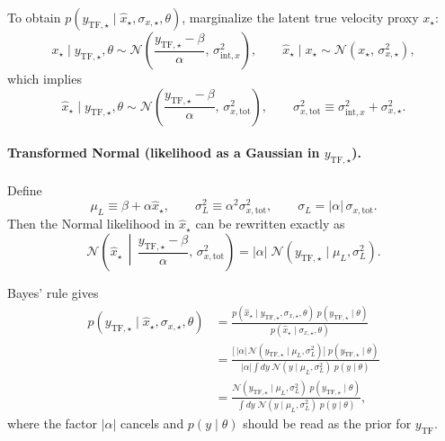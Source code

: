 To obtain $p(y_{\mathrm{TF},\star} \mid \hat x_\star,\sigma_{x,\star},\theta)$, marginalize the latent
true velocity proxy $x_\star$:
\begin{equation}
x_\star \mid y_{\mathrm{TF},\star},\theta
\sim
\mathcal N\!\left(\frac{y_{\mathrm{TF},\star}-\beta}{\alpha},\,\sigma_{\mathrm{int},x}^2\right),
\qquad
\hat x_\star \mid x_\star \sim \mathcal N\!\left(x_\star,\,\sigma_{x,\star}^2\right),
\end{equation}
which implies
\begin{equation}
\hat x_\star \mid y_{\mathrm{TF},\star},\theta
\sim
\mathcal N\!\left(\frac{y_{\mathrm{TF},\star}-\beta}{\alpha},\,\sigma_{x,\mathrm{tot}}^2\right),
\qquad
\sigma_{x,\mathrm{tot}}^2 \equiv \sigma_{\mathrm{int},x}^2+\sigma_{x,\star}^2 .
\label{eq:xhat_given_yTF}
\end{equation}

\paragraph{Transformed Normal (likelihood as a Gaussian in $y_{\mathrm{TF},\star}$).}
Define
\begin{equation}
\mu_L \equiv \beta+\alpha\hat x_\star,
\qquad
\sigma_L^2 \equiv \alpha^2\sigma_{x,\mathrm{tot}}^2,
\qquad
\sigma_L = |\alpha|\,\sigma_{x,\mathrm{tot}}.
\label{eq:muL_sigmaL_defs}
\end{equation}
Then the Normal likelihood in $\hat x_\star$ can be rewritten exactly as
\begin{equation}
\mathcal N\!\left(\hat x_\star \,\middle|\, \frac{y_{\mathrm{TF},\star}-\beta}{\alpha},\,\sigma_{x,\mathrm{tot}}^2\right)
=
|\alpha|\;
\mathcal N\!\left(y_{\mathrm{TF},\star}\mid \mu_L,\sigma_L^2\right).
\label{eq:likelihood_transformed_normal}
\end{equation}

Bayes' rule gives
\begin{align}
p\!\left(y_{\mathrm{TF},\star} \mid \hat x_\star,\sigma_{x,\star},\theta\right)
&=
\frac{
p\!\left(\hat x_\star \mid y_{\mathrm{TF},\star},\sigma_{x,\star},\theta\right)\;
p\!\left(y_{\mathrm{TF},\star}\mid\theta\right)
}{
p\!\left(\hat x_\star \mid \sigma_{x,\star},\theta\right)
}
\nonumber\\
&=
\frac{
\bigl[\,|\alpha|\,\mathcal N(y_{\mathrm{TF},\star}\mid \mu_L,\sigma_L^2)\bigr]\;
p(y_{\mathrm{TF},\star}\mid\theta)
}{
|\alpha|\int dy\;\mathcal N(y\mid \mu_L,\sigma_L^2)\;p(y\mid\theta)
}
\nonumber\\
&=
\frac{
\mathcal N(y_{\mathrm{TF},\star}\mid \mu_L,\sigma_L^2)\;
p(y_{\mathrm{TF},\star}\mid\theta)
}{
\int dy\;\mathcal N(y\mid \mu_L,\sigma_L^2)\;p(y\mid\theta)
},
\label{eq:bayes_yTF_transformed}
\end{align}
where the factor $|\alpha|$ cancels and $p(y\mid\theta)$ should be read as the prior for $y_{\mathrm{TF}}$.

